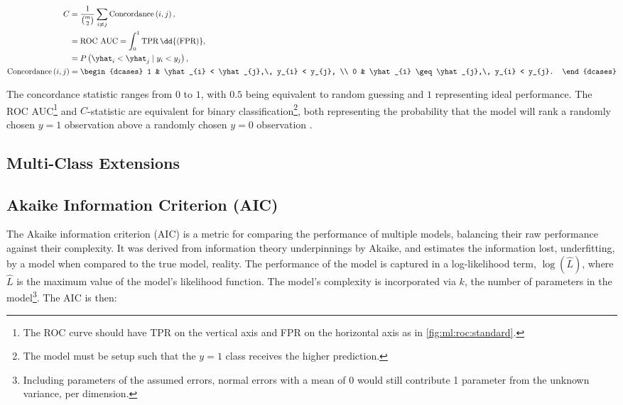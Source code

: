 \begin{subequations} \label{eq:concordance}
\begin{align}
C &= \frac{1}{ \binom{m}{2} } \sum_{i \neq j} \text{Concordance}\left(i, j\right), \label{eq:concordance:C} \\
&= \text{ROC AUC} = \int_{0}^{1} \text{TPR}\, \dd{\left(\text{FPR}\right)}, \label{eq:concordance:ROC_AUC} \\
&= P\left(\yhat_{i} < \yhat_{j} \mid y_{i} < y_{j} \right), \label{eq:concordance:P} \\
\text{Concordance}\left(i, j\right) &= \begin{dcases}
1 & \yhat_{i} < \yhat_{j},\, y_{i} < y_{j}, \\
0 & \yhat_{i} \geq \yhat_{j},\, y_{i} < y_{j}.
\end{dcases} \label{eq:concordance:concordance} \\
\end{align}
\end{subequations}

The concordance statistic ranges from $0$ to $1$,
with $0.5$ being equivalent to random guessing and $1$ representing ideal performance.
The ROC AUC\footnote{The ROC curve should have TPR on the vertical axis and FPR on the horizontal axis as in \cref{fig:ml:roc:standard}.} and $C$-statistic are equivalent for
binary classification\footnote{The model must be setup such that the $y=1$ class receives the higher \yhat prediction.},
both representing the probability that
the model will rank a randomly chosen $y=1$ observation above a randomly chosen $y=0$ observation \cite{Hand2001,Fawcett2006861}.

\subsection{Multi-Class Extensions}
\label{ml_general:eval:multi_class}


\subsection{Akaike Information Criterion (AIC)}
\label{ml_general:eval:AIC}

The Akaike information criterion (AIC) \cite{1100705}
is a metric for comparing the performance of multiple models,
balancing their raw performance against their complexity.
It was derived from information theory underpinnings by Akaike,
and estimates the information lost, \ie underfitting,
by a model when compared to the true model, \ie reality.
The performance of the model is captured in a
log-likelihood term, $\log\left(\hat{L}\right)$,
where $\hat{L}$ is the maximum value of the model's likelihood function.
The model's complexity is incorporated via $k$, the number of parameters in the model\footnote{Including parameters of the assumed errors,
\eg \iid normal errors with a mean of 0 would still contribute 1 parameter from the unknown variance, per dimension.}.
The AIC is then:

